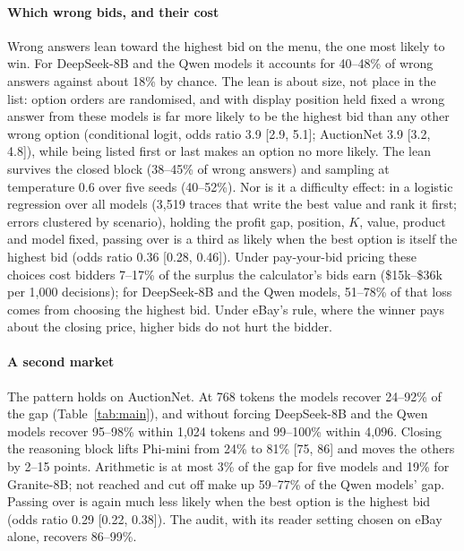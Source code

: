 \documentclass[sigconf,review,anonymous]{acmart}
\begin{document}
\paragraph{Which wrong bids, and their cost}
Wrong answers lean toward the highest bid on the menu, the one most likely to win. For DeepSeek-8B and the Qwen models it accounts for 40--48\% of wrong answers against about 18\% by chance. The lean is about size, not place in the list: option orders are randomised, and with display position held fixed a wrong answer from these models is far more likely to be the highest bid than any other wrong option (conditional logit, odds ratio 3.9 [2.9, 5.1]; AuctionNet 3.9 [3.2, 4.8]), while being listed first or last makes an option no more likely. The lean survives the closed block (38--45\% of wrong answers) and sampling at temperature 0.6 over five seeds (40--52\%). Nor is it a difficulty effect: in a logistic regression over all models (3{,}519 traces that write the best value and rank it first; errors clustered by scenario), holding the profit gap, position, $K$, value, product and model fixed, passing over is a third as likely when the best option is itself the highest bid (odds ratio 0.36 [0.28, 0.46]). Under pay-your-bid pricing these choices cost bidders 7--17\% of the surplus the calculator's bids earn (\$15k--\$36k per 1{,}000 decisions); for DeepSeek-8B and the Qwen models, 51--78\% of that loss comes from choosing the highest bid. Under eBay's rule, where the winner pays about the closing price, higher bids do not hurt the bidder.

\paragraph{A second market}
The pattern holds on AuctionNet. At 768 tokens the models recover 24--92\% of the gap (Table~\ref{tab:main}), and without forcing DeepSeek-8B and the Qwen models recover 95--98\% within 1{,}024 tokens and 99--100\% within 4{,}096. Closing the reasoning block lifts Phi-mini from 24\% to 81\% [75, 86] and moves the others by 2--15 points. Arithmetic is at most 3\% of the gap for five models and 19\% for Granite-8B; not reached and cut off make up 59--77\% of the Qwen models' gap. Passing over is again much less likely when the best option is the highest bid (odds ratio 0.29 [0.22, 0.38]). The audit, with its reader setting chosen on eBay alone, recovers 86--99\%.
\end{document}
